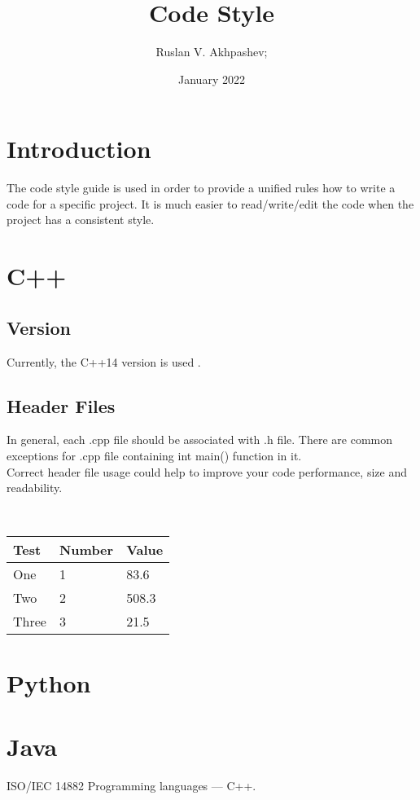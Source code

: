 \documentclass{article}
\title{Code Style}
\author{Ruslan V. Akhpashev;}
\affil{SibSUTIS, email: ruslan.akhpashev@gmail.com, github: @fzybot.}
\date{January 2022}
\begin{document}
\maketitle

\section{Introduction}
The code style guide is used in order to provide a unified rules how to write a code for a specific project. It is much easier to read/write/edit the code when the project has a consistent style.
\section{C++}
\subsection{Version}
Currently, the C++14 version is used \cite{CPP}.
\subsection{Header Files}
In general, each \colorbox{BurntOrange}{.cpp} file should be associated with \colorbox{BurntOrange}{.h} file. There are common exceptions for  \colorbox{BurntOrange}{.cpp} file containing \colorbox{BurntOrange}{int main()} function in it. \\
Correct header file usage could help to improve your code performance, size and readability. 

\\

\begin{tabular}{ | l | l | l | }
\hline
Test & Number & Value \\ \hline
One & 1 & 83.6 \\
Two & 2 & 508.3 \\
Three & 3 & 21.5 \\
\hline
\end{tabular}

\section{Python}

\section{Java}

\begin{thebibliography}{3}
ISO/IEC 14882 Programming languages — C++.
\end{thebibliography}
\end{document}
